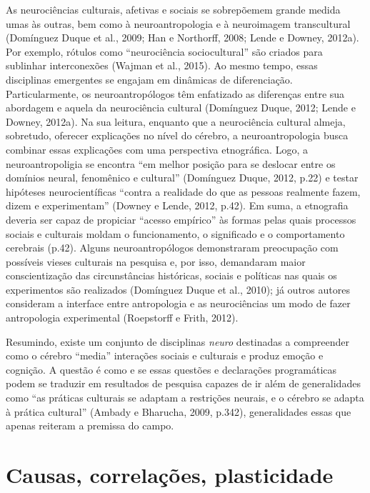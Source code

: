 As neurociências culturais, afetivas e sociais se sobrepõemem grande
medida umas às outras, bem como à neuroantropologia e à neuroimagem
transcultural (Domínguez Duque et al., 2009; Han e Northorff, 2008;
Lende e Downey, 2012a). Por exemplo, rótulos como ``neurociência
sociocultural'' são criados para sublinhar interconexões (Wajman et al.,
2015). Ao mesmo tempo, essas disciplinas emergentes se engajam em
dinâmicas de diferenciação. Particularmente, os neuroantropólogos têm
enfatizado as diferenças entre sua abordagem e aquela da neurociência
cultural (Domínguez Duque, 2012; Lende e Downey, 2012a). Na sua leitura,
enquanto que a neurociência cultural almeja, sobretudo, oferecer
explicações no nível do cérebro, a neuroantropologia busca combinar
essas explicações com uma perspectiva etnográfica. Logo, a
neuroantropoligia se encontra ``em melhor posição para se deslocar entre
os domínios neural, fenomênico e cultural'' (Domínguez Duque, 2012,
p.22) e testar hipóteses neurocientíficas ``contra a realidade do que as
pessoas realmente fazem, dizem e experimentam'' (Downey e Lende, 2012,
p.42). Em suma, a etnografia deveria ser capaz de propiciar ``acesso
empírico'' às formas pelas quais processos sociais e culturais moldam o
funcionamento, o significado e o comportamento cerebrais (p.42). Alguns
neuroantropólogos demonstraram preocupação com possíveis vieses
culturais na pesquisa e, por isso, demandaram maior conscientização das
circunstâncias históricas, sociais e políticas nas quais os experimentos
são realizados (Domínguez Duque et al., 2010); já outros autores
consideram a interface entre antropologia e as neurociências um modo de
fazer antropologia experimental (Roepstorff e Frith, 2012).

Resumindo, existe um conjunto de disciplinas \emph{neuro} destinadas a
compreender como o cérebro ``media'' interações sociais e culturais e
produz emoção e cognição. A questão é como e se essas questões e
declarações programáticas podem se traduzir em resultados de pesquisa
capazes de ir além de generalidades como ``as práticas culturais se
adaptam a restrições neurais, e o cérebro se adapta à prática cultural''
(Ambady e Bharucha, 2009, p.342), generalidades essas que apenas
reiteram a premissa do campo.

\chapter{Causas, correlações, plasticidade}

